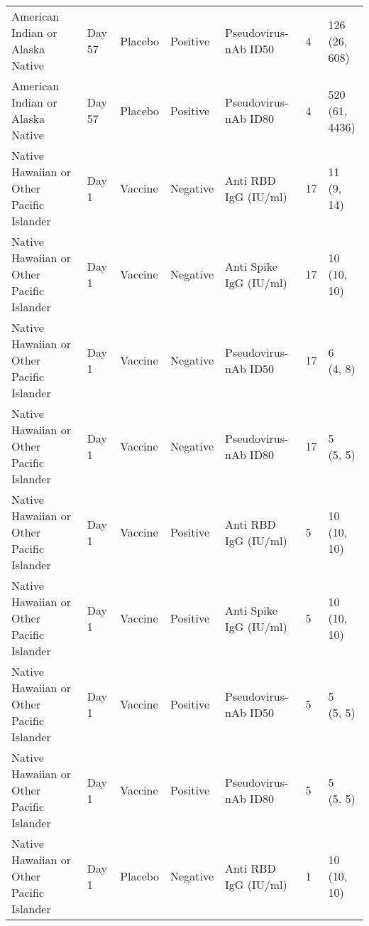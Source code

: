 \documentclass[]{book}
\theoremstyle{definition}
\theoremstyle{definition}
\theoremstyle{definition}
\newcommand{\1}{\mathbbm{1}}
\begin{document}
\begin{landscape}
\begin{ThreePartTable}
\begin{longtable}[t]{>{\raggedright\arraybackslash}p{7cm}llllll}
\hspace{1em}American Indian or Alaska Native & Day 57 & Placebo & Positive & Pseudovirus-nAb ID50 & 4 & \makecell[l]{126\\(26, 608)}\\
\hspace{1em}American Indian or Alaska Native & Day 57 & Placebo & Positive & Pseudovirus-nAb ID80 & 4 & \makecell[l]{520\\(61, 4436)}\\
\hspace{1em}Native Hawaiian or Other Pacific Islander & Day 1 & Vaccine & Negative & Anti RBD IgG (IU/ml) & 17 & \makecell[l]{11\\(9, 14)}\\
\hspace{1em}Native Hawaiian or Other Pacific Islander & Day 1 & Vaccine & Negative & Anti Spike IgG (IU/ml) & 17 & \makecell[l]{10\\(10, 10)}\\
\hspace{1em}Native Hawaiian or Other Pacific Islander & Day 1 & Vaccine & Negative & Pseudovirus-nAb ID50 & 17 & \makecell[l]{6\\(4, 8)}\\
\hspace{1em}Native Hawaiian or Other Pacific Islander & Day 1 & Vaccine & Negative & Pseudovirus-nAb ID80 & 17 & \makecell[l]{5\\(5, 5)}\\
\hspace{1em}Native Hawaiian or Other Pacific Islander & Day 1 & Vaccine & Positive & Anti RBD IgG (IU/ml) & 5 & \makecell[l]{10\\(10, 10)}\\
\hspace{1em}Native Hawaiian or Other Pacific Islander & Day 1 & Vaccine & Positive & Anti Spike IgG (IU/ml) & 5 & \makecell[l]{10\\(10, 10)}\\
\hspace{1em}Native Hawaiian or Other Pacific Islander & Day 1 & Vaccine & Positive & Pseudovirus-nAb ID50 & 5 & \makecell[l]{5\\(5, 5)}\\
\hspace{1em}Native Hawaiian or Other Pacific Islander & Day 1 & Vaccine & Positive & Pseudovirus-nAb ID80 & 5 & \makecell[l]{5\\(5, 5)}\\
\hspace{1em}Native Hawaiian or Other Pacific Islander & Day 1 & Placebo & Negative & Anti RBD IgG (IU/ml) & 1 & \makecell[l]{10\\(10, 10)}\\

\end{longtable}
\end{ThreePartTable}
\end{landscape}
\end{document}
